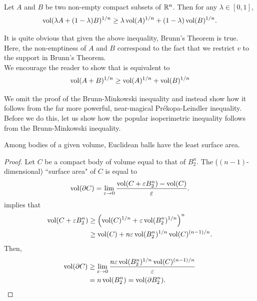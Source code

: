 \begin{ftheo}
\label{brunn minkowski inequality}
Let $A$ and $B$ be two non-empty compact subsets of $\mathbb{R}^n$. Then for any $\lambda\in[0,1]$,
\begin{equation}
\label{eqn brunn minkowski inequality}
    \operatorname{vol}(\lambda A + (1-\lambda) B)^{1/n} \geq \lambda\operatorname{vol}(A)^{1/n} + (1-\lambda)\operatorname{vol}(B)^{1/n}.
\end{equation}
\end{ftheo}
It is quite obvious that given the above inequality, Brunn's Theorem is true. Here, the non-emptiness of $A$ and $B$ correspond to the fact that we restrict $v$ to the support in Brunn's Theorem.\\

We encourage the reader to show that  is equivalent to
\begin{equation}
\label{eqn brunn minkowski inequality alt no lambda}
    \operatorname{vol}(A+B)^{1/n} \geq \operatorname{vol}(A)^{1/n} + \operatorname{vol}(B)^{1/n}
\end{equation}

We omit the proof of the Brunn-Minkowski inequality and instead show how it follows from the far more powerful, near-magical Pr\'{e}kopa-Leindler inequality.\\
Before we do this, let us show how the popular isoperimetric inequality follows from the Brunn-Minkowski inequality.

\begin{theorem}
\label{isoperimetric inequality}
Among bodies of a given volume, Euclidean balls have the least surface area.
\end{theorem}
\begin{proof}
Let $C$ be a compact body of volume equal to that of $B_2^n$. The ($(n-1)$-dimensional) ``surface area" of $C$ is equal to
\[ \operatorname{vol}(\partial C) = \lim_{\varepsilon\to 0} \frac{\operatorname{vol}(C + \varepsilon B_2^n) - \operatorname{vol}(C)}{\varepsilon}. \]
 implies that
\begin{align*}
    \operatorname{vol}(C+\varepsilon B_2^n) &\geq \left(\operatorname{vol}(C)^{1/n} + \varepsilon\operatorname{vol}(B_2^n)^{1/n}\right)^{n} \\
    &\geq \operatorname{vol}(C) + n\varepsilon\operatorname{vol}(B_2^n)^{1/n}\operatorname{vol}(C)^{(n-1)/n}.
\end{align*}
Then,
\begin{align*}
    \operatorname{vol}(\partial C) &\geq \lim_{\varepsilon\to 0} \frac{n\varepsilon\operatorname{vol}(B_2^n)^{1/n}\operatorname{vol}(C)^{(n-1)/n}}{\varepsilon}\\
    &= n\operatorname{vol}(B_2^n) = \operatorname{vol}(\partial B_2^n).
\end{align*}
\end{proof}

